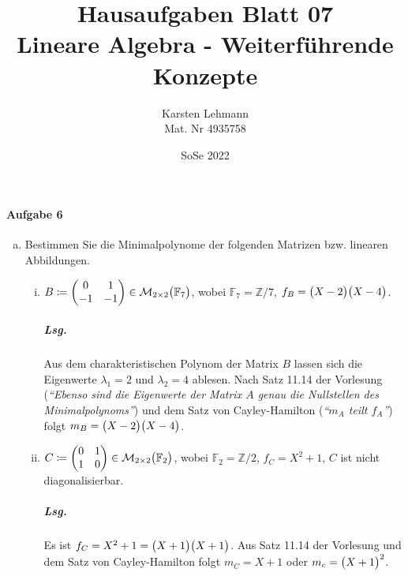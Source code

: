 \documentclass{scrreprt}
\author{Karsten Lehmann\\Mat. Nr 4935758}
\date{SoSe 2022}
\title{Hausaufgaben Blatt 07\\Lineare Algebra - Weiterführende Konzepte}
\begin{document}
\paragraph{Aufgabe 6}
\begin{enumerate}[(a)]
\item Bestimmen Sie die Minimalpolynome der folgenden Matrizen
  bzw. linearen Abbildungen.
  \begin{enumerate}[(i)]
  \item $B \coloneqq \begin{pmatrix}
      0 & 1 \\
      -1 & -1 \\
    \end{pmatrix} \in \mathcal{M}_{2 \times 2}\qty\big(\mathbb{F}_7)$,
    wobei $\mathbb{F}_7 = \mathbb{Z}/7$,
    $f_B = \qty\big(X - 2)\qty\big(X - 4)$.

    \subparagraph{Lsg.} Aus dem charakteristischen Polynom der Matrix $B$ lassen
    sich die Eigenwerte $\lambda_1 = 2$ und $\lambda_2 = 4$ ablesen.
    Nach Satz 11.14 der Vorlesung (\emph{``Ebenso sind die Eigenwerte der Matrix
      $A$ genau die Nullstellen des Minimalpolynoms''}) und dem Satz von
    Cayley-Hamilton (\emph{``$m_A$ teilt $f_A$''}) folgt
    $m_B = \qty\big(X - 2)\qty\big(X - 4)$.

  \item $C \coloneqq \begin{pmatrix}
      0 & 1 \\
      1 & 0 \\
    \end{pmatrix} \in \mathcal{M}_{2 \times 2}\qty\big(\mathbb{F}_2)$,
    wobei $\mathbb{F}_2 = \mathbb{Z}/2$,
    $f_C = X^2 + 1$, $C$ ist nicht diagonalisierbar.

    \subparagraph{Lsg.} Es ist $f_C = X^2 + 1 = \qty\big(X + 1)\qty\big(X + 1)$.
    Aus Satz 11.14 der Vorlesung und dem Satz von Cayley-Hamilton folgt
    $m_C = X + 1$ oder $m_c = \qty\big(X + 1)^2$.


\end{enumerate}
\end{enumerate}
\end{document}
